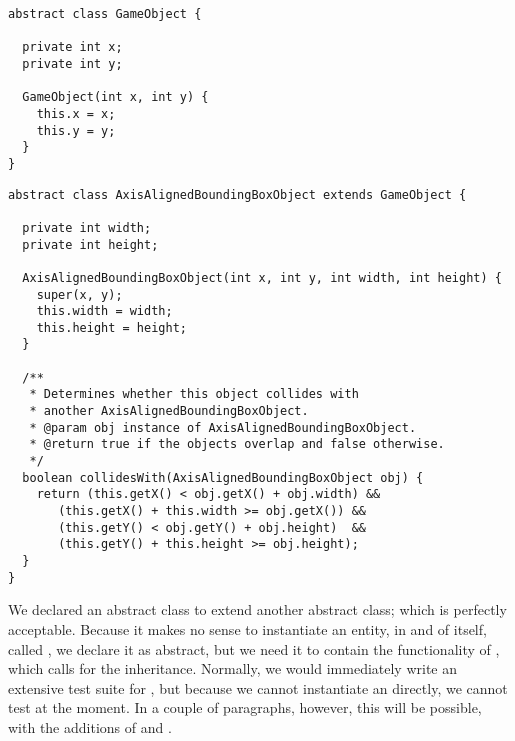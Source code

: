 \begin{lstlisting}[language=MyJava]
abstract class GameObject {
  
  private int x;
  private int y;

  GameObject(int x, int y) {
    this.x = x;
    this.y = y;
  }
}
\end{lstlisting}


\begin{lstlisting}[language=MyJava]
abstract class AxisAlignedBoundingBoxObject extends GameObject {
  
  private int width;
  private int height;

  AxisAlignedBoundingBoxObject(int x, int y, int width, int height) {
    super(x, y);
    this.width = width;
    this.height = height;
  }

  /**
   * Determines whether this object collides with 
   * another AxisAlignedBoundingBoxObject.
   * @param obj instance of AxisAlignedBoundingBoxObject.
   * @return true if the objects overlap and false otherwise.
   */
  boolean collidesWith(AxisAlignedBoundingBoxObject obj) {
    return (this.getX() < obj.getX() + obj.width) &&
	   (this.getX() + this.width >= obj.getX()) &&
 	   (this.getY() < obj.getY() + obj.height)  &&
	   (this.getY() + this.height >= obj.height); 
  }
}
\end{lstlisting}

We declared an abstract class to extend another abstract class; which is perfectly acceptable. Because it makes no sense to instantiate an entity, in and of itself, called , we declare it as abstract, but we need it to contain the functionality of , which calls for the inheritance. Normally, we would immediately write an extensive test suite for , but because we cannot instantiate an  directly, we cannot test  at the moment. In a couple of paragraphs, however, this will be possible, with the additions of  and .

